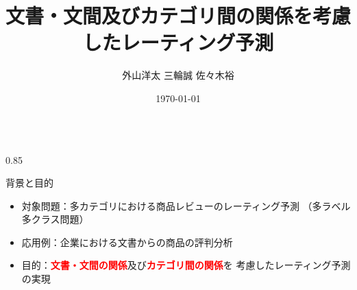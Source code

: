 \documentclass[unicode,10pt]{beamer}
\title{文書・文間及びカテゴリ間の関係を考慮したレーティング予測}
\institute{豊田工業大学 知能数理研究室}
\author{外山洋太 三輪誠 佐々木裕}
\date{\today}
\newlength{\mycolumnwidth}
\newcommand{\fire}[1]{\textcolor{red}{\textbf{#1}}}
\begin{document}
\begin{frame}[t]
\vspace{-1em} %
\begin{columns}[onlytextwidth,t]

\begin{column}{0.85\mycolumnwidth}
  \begin{block}{背景と目的}
    \begin{itemize}
      \item 対象問題：多カテゴリにおける商品レビューのレーティング予測
                      （多ラベル多クラス問題）
      \item 応用例：企業における文書からの商品の評判分析
      \item 目的：\fire{文書・文間の関係}及び\fire{カテゴリ間の関係}を
                  考慮したレーティング予測の実現
    \end{itemize}
  \end{block}


\end{column}
\end{columns}
\end{frame}
\end{document}
